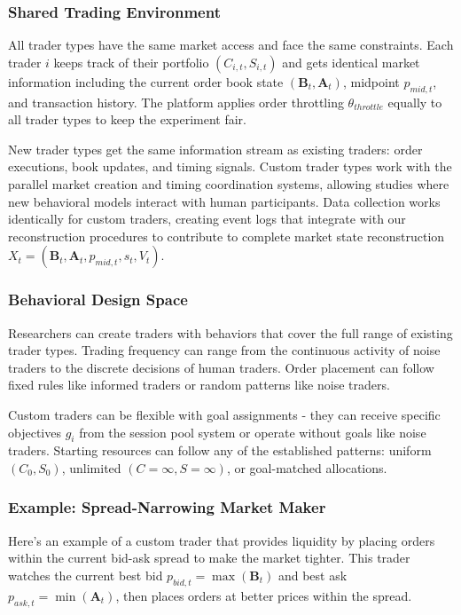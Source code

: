 \subsubsection{Shared Trading Environment}

All trader types have the same market access and face the same constraints. Each trader $i$ keeps track of their portfolio $(C_{i,t}, S_{i,t})$ and gets identical market information including the current order book state $(\mathbf{B}_t, \mathbf{A}_t)$, midpoint $p_{mid,t}$, and transaction history. The platform applies order throttling $\theta_{throttle}$ equally to all trader types to keep the experiment fair.

New trader types get the same information stream as existing traders: order executions, book updates, and timing signals. Custom trader types work with the parallel market creation and timing coordination systems, allowing studies where new behavioral models interact with human participants. Data collection works identically for custom traders, creating event logs that integrate with our reconstruction procedures to contribute to complete market state reconstruction $X_t = (\mathbf{B}_t, \mathbf{A}_t, p_{mid,t}, s_t, V_t)$.

\subsubsection{Behavioral Design Space}

Researchers can create traders with behaviors that cover the full range of existing trader types. Trading frequency can range from the continuous activity of noise traders to the discrete decisions of human traders. Order placement can follow fixed rules like informed traders or random patterns like noise traders.

Custom traders can be flexible with goal assignments - they can receive specific objectives $g_i$ from the session pool system or operate without goals like noise traders. Starting resources can follow any of the established patterns: uniform $(C_0, S_0)$, unlimited $(C = \infty, S = \infty)$, or goal-matched allocations.

\subsubsection{Example: Spread-Narrowing Market Maker}

Here's an example of a custom trader that provides liquidity by placing orders within the current bid-ask spread to make the market tighter. This trader watches the current best bid $p_{bid,t} = \max(\mathbf{B}_t)$ and best ask $p_{ask,t} = \min(\mathbf{A}_t)$, then places orders at better prices within the spread.

